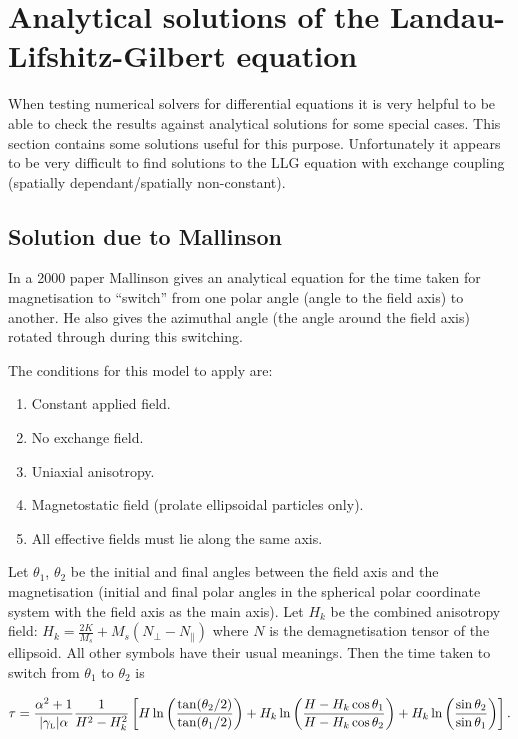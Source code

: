 \chapter{Analytical solutions of the Landau-Lifshitz-Gilbert equation}

When testing numerical solvers for differential equations it is very
helpful to be able to check the results against analytical solutions for
some special cases. This section contains some solutions useful for this
purpose.
Unfortunately it appears to be very difficult to find solutions to the LLG equation with exchange coupling (\ie spatially dependant/spatially non-constant).

\section{Solution due to Mallinson}

In a 2000 paper\cite{Mallinson2000} Mallinson gives an analytical equation for the time taken for magnetisation to ``switch'' from one polar angle (angle to the field axis) to another.
He also gives the azimuthal angle (the angle around the field axis) rotated through during this switching.

The conditions for this model to apply are:
\begin{enumerate}
\item Constant applied field.
\item No exchange field.
\item Uniaxial anisotropy.
\item Magnetostatic field (prolate ellipsoidal particles only).
\item All effective fields must lie along the same axis.
\end{enumerate}

Let $\theta_1$, $\theta_2$ be the initial and final angles between the field axis and the magnetisation (\ie initial and final polar angles in the spherical polar coordinate system with the field axis as the main axis). Let $H_k$ be the combined anisotropy field: $H_k = \frac{2 K}{M_s} + M_s(N_\perp - N_\parallel)$ where $N$ is the demagnetisation tensor of the ellipsoid. All other symbols have their usual meanings. Then the time taken to switch from $\theta_1$ to $\theta_2$ is

\begin{equation}
  \tau = \frac{\alpha^2 +1}{{\left|{\gamma_{\text{\tiny{L}}}} \right|} \alpha} \frac{1}{H^2 - H_k^2}
  \left[ H \ln \left( \frac{\tan(\theta_2/2)}{\tan(\theta_1/2)} \right)
       + H_k \ln \left( \frac{H - H_k \cos\theta_1}{H - H_k \cos\theta_2} \right)
       + H_k \ln \left( \frac{\sin\theta_2}{\sin\theta_1} \right)
    \right].
\end{equation}

